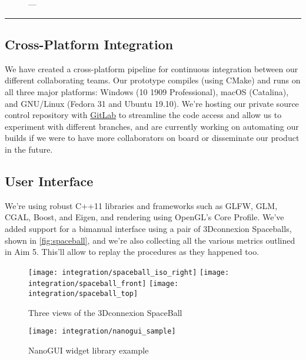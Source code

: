\begin{figure}
  \centering%
	\caption{---}\label{fig:stereo}
\end{figure}

\hrule%

\subsection{Cross-Platform Integration}\label{ssec:cross}
We have created a cross-platform pipeline for continuous integration between our different collaborating teams. Our prototype compiles (using CMake) and runs on all three major platforms: Windows (10 1909 Professional), macOS (Catalina), and GNU/Linux (Fedora 31 and Ubuntu 19.10). We're hosting our private source control repository with \href{https://gitlab.com}{GitLab} to streamline the code access and allow us to experiment with different branches, and are currently working on automating our builds if we were to have more collaborators on board or disseminate our product in the future.

\subsection{User Interface}\label{ssec:console}

We're using robust C++11 libraries and frameworks such as GLFW, GLM, CGAL, Boost, and Eigen, and rendering using OpenGL's Core Profile. We've added support for a bimanual interface using a pair of 3Dconnexion Spaceballs, shown in \autoref{fig:spaceball}, and we're also collecting all the various metrics outlined in Aim 5. This'll allow to replay the procedures as they happened too.

\begin{figure}
  \centering%
  \texttt{[image: integration/spaceball\_iso\_right]}
  \hfill%
  \texttt{[image: integration/spaceball\_front]}
  \hfill%
  \texttt{[image: integration/spaceball\_top]}
  \caption{Three views of the 3Dconnexion SpaceBall}\label{fig:spaceball}
\end{figure}

\begin{figure}
  \centering%
  \texttt{[image: integration/nanogui\_sample]}
  \caption{NanoGUI widget library example}\label{fig:nanogui}
\end{figure}

